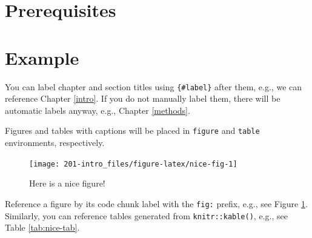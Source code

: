 \documentclass[]{book}
\begin{document}
\hypertarget{prerequisites}{%
\section{Prerequisites}\label{prerequisites}}

\hypertarget{example}{%
\section{Example}\label{example}}

You can label chapter and section titles using \texttt{\{\#label\}} after them, e.g., we can reference Chapter \ref{intro}. If you do not manually label them, there will be automatic labels anyway, e.g., Chapter \ref{methods}.

Figures and tables with captions will be placed in \texttt{figure} and \texttt{table} environments, respectively.

\begin{figure}

{\centering \texttt{[image: 201-intro\_files/figure-latex/nice-fig-1]} 

}

\caption{Here is a nice figure!}\label{fig:nice-fig}
\end{figure}

Reference a figure by its code chunk label with the \texttt{fig:} prefix, e.g., see Figure \ref{fig:nice-fig}. Similarly, you can reference tables generated from \texttt{knitr::kable()}, e.g., see Table \ref{tab:nice-tab}.
\end{document}
